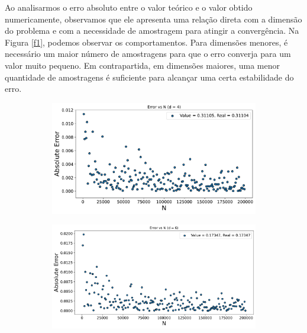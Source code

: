\documentclass[a4paper, 12pt]{article}
\begin{document}
Ao analisarmos o erro absoluto entre o valor teórico e o valor obtido numericamente, observamos que 
ele apresenta uma relação direta com a dimensão do problema e com a necessidade de amostragem para 
atingir a convergência. Na Figura \ref{f1}, podemos observar os comportamentos. Para dimensões menores, é necessário um maior número de amostragens para 
que o erro converja para um valor muito pequeno. Em contrapartida, em dimensões maiores, uma menor 
quantidade de amostragens é suficiente para alcançar uma certa estabilidade do erro.
\begin{figure}[!htb]
    \centering
    \begin{subfigure}{0.6\textwidth}
        \includegraphics[width=\linewidth]{Q4.pdf}
        \caption{}
        \label{fig:subfig1}
    \end{subfigure}
    \hfill
    \begin{subfigure}{0.6\textwidth}
        \includegraphics[width=\linewidth]{Q6.pdf}
        \caption{}
        \label{fig:subfig2}
    \end{subfigure}


\end{figure}
\end{document}
